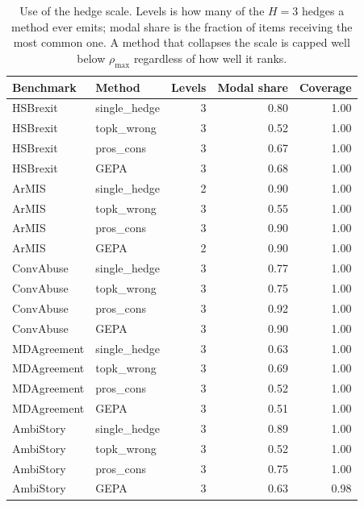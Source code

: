 \begin{table}[t]
\centering
\small
\begin{tabular}{llrrr}
\hline
Benchmark & Method & Levels & Modal share & Coverage \\
\hline
HSBrexit & single\_hedge & 3 & 0.80 & 1.00 \\
HSBrexit & topk\_wrong & 3 & 0.52 & 1.00 \\
HSBrexit & pros\_cons & 3 & 0.67 & 1.00 \\
HSBrexit & GEPA & 3 & 0.68 & 1.00 \\
ArMIS & single\_hedge & 2 & 0.90 & 1.00 \\
ArMIS & topk\_wrong & 3 & 0.55 & 1.00 \\
ArMIS & pros\_cons & 3 & 0.90 & 1.00 \\
ArMIS & GEPA & 2 & 0.90 & 1.00 \\
ConvAbuse & single\_hedge & 3 & 0.77 & 1.00 \\
ConvAbuse & topk\_wrong & 3 & 0.75 & 1.00 \\
ConvAbuse & pros\_cons & 3 & 0.92 & 1.00 \\
ConvAbuse & GEPA & 3 & 0.90 & 1.00 \\
MDAgreement & single\_hedge & 3 & 0.63 & 1.00 \\
MDAgreement & topk\_wrong & 3 & 0.69 & 1.00 \\
MDAgreement & pros\_cons & 3 & 0.52 & 1.00 \\
MDAgreement & GEPA & 3 & 0.51 & 1.00 \\
AmbiStory & single\_hedge & 3 & 0.89 & 1.00 \\
AmbiStory & topk\_wrong & 3 & 0.52 & 1.00 \\
AmbiStory & pros\_cons & 3 & 0.75 & 1.00 \\
AmbiStory & GEPA & 3 & 0.63 & 0.98 \\
\hline
\end{tabular}
\caption{Use of the hedge scale. Levels is how many of the $H=3$ hedges a method ever emits; modal share is the fraction of items receiving the most common one. A method that collapses the scale is capped well below $\rho_{\max}$ regardless of how well it ranks.}
\label{tab:stability}
\end{table}